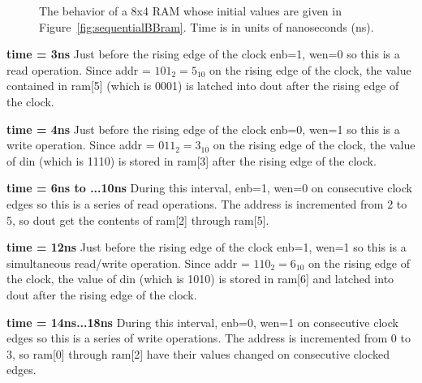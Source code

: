 \begin{landscape}
    \begin{figure}[ht]


        \caption{The behavior of a 8x4 RAM whose initial values are given in Figure~\ref{fig:sequentialBBram}.
        Time is in units of nanoseconds (ns).}
        \label{fig:sequentialBBRamReadWrite}
    \end{figure}

    \color{red}
    \textbf{time = 3ns} Just before the rising edge of the clock  enb=1, wen=0 so this is a read operation.
    Since addr = $101_2 = 5_{10}$ on the rising edge of the clock, the value contained in ram[5] (which is
    0001) is latched into dout after the rising edge of the clock.

    \color{orange}
    \textbf{time = 4ns} Just before the rising edge of the clock  enb=0, wen=1 so this is a write operation.
    Since addr = $011_2 = 3_{10}$ on the rising edge of the clock, the value of din (which is 1110) is stored
    in ram[3]  after the rising edge of the clock.

    \color{lime}
    \textbf{time = 6ns to ...10ns}  During this interval,  enb=1, wen=0 on consecutive clock edges so this
    is a series of read operations.  The address is incremented from 2 to 5, so dout get the contents of
    ram[2] through ram[5].

    \color{green}
    \textbf{time = 12ns} Just before the rising edge of the clock  enb=1, wen=1 so this is a simultaneous
    read/write operation.
    Since addr = $110_2 = 6_{10}$ on the rising edge of the clock, the value of din (which is 1010) is stored
    in ram[6] and latched into dout after the rising edge of the clock.

    \color{blue}
    \textbf{time = 14ns...18ns} During this interval, enb=0, wen=1 on consecutive clock edges so this
    is a series of write operations.  The address is incremented from 0 to 3, so ram[0] through ram[2] have
    their values changed on consecutive clocked edges.

    \color{black}

\end{landscape}

